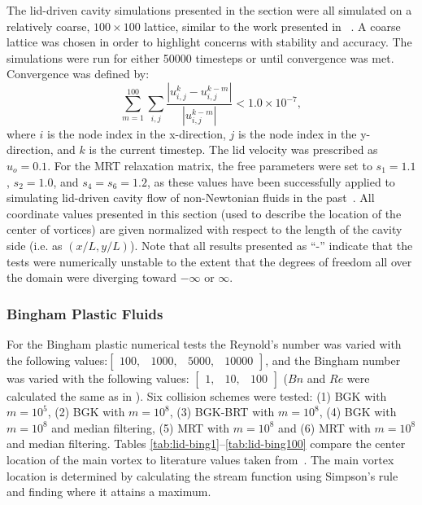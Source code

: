 The lid-driven cavity simulations presented in the section were all simulated on a relatively coarse, $100 \times 100$ lattice, similar to the work presented in ~\cite{brownlee2008nonequilibrium}.
A coarse lattice was chosen in order to highlight concerns with stability and accuracy.
The simulations were run for either 50000 timesteps or until convergence was met.
Convergence was defined by:
\begin{equation} \label{eq:convergence}
\sum_{m=1}^{100} \sum_{i, j} \frac{|u_{i, j}^k - u_{i, j}^{k-m}|}{|u_{i, j}^{k-m}|} < 1.0 \times 10^{-7},
\end{equation}
\noindent where $i$ is the node index in the x-direction, $j$ is the node index in the y-direction, and $k$ is the current timestep.
The lid velocity was prescribed as $u_o = 0.1$.
For the MRT relaxation matrix, the free parameters were set to $s_1 = 1.1$, $s_2 = 1.0$, and $s_4 = s_6 = 1.2$, as these values have been successfully applied to simulating lid-driven cavity flow of non-Newtonian fluids in the past~\cite{chen2014simulations,li2014simulation}.
All coordinate values presented in this section (used to describe the location of the center of vortices) are given normalized with respect to the length of the cavity side (i.e. as $(x / L, y / L)$).
Note that all results presented as ``-'' indicate that the tests were numerically unstable to the extent that the degrees of freedom all over the domain were diverging toward $-\infty$ or $\infty$.

\subsubsection{Bingham Plastic Fluids}

For the Bingham plastic numerical tests the Reynold's number was varied with the following values:$\begin{bmatrix}100,&1000,&5000,&10000\end{bmatrix}$, and the Bingham number was varied with the following values: $\begin{bmatrix}1,&10,&100\end{bmatrix}$ ($Bn$ and $Re$ were calculated the same as in ).
Six collision schemes were tested: (1) BGK with $m = 10^5$, (2) BGK with $m = 10^8$, (3) BGK-BRT with $m = 10^8$, (4) BGK with $m = 10^8$ and median filtering, (5) MRT with $m = 10^8$ and (6) MRT with $m = 10^8$ and median filtering.
Tables \ref{tab:lid-bing1}--\ref{tab:lid-bing100} compare the center location of the main vortex to literature values taken from~\citet{syrakos2014performance}.
The main vortex location is determined by calculating the stream function using Simpson's rule and finding where it attains a maximum.

